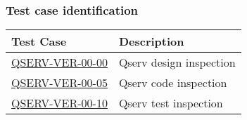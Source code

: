 \subsubsection{Test case identification}

\begin{longtable} {|p{}|p{}|}\hline
\textbf{Test Case}  & \textbf{Description} \\\hline
\hyperref[qserv-ver-00-00]{\textsc{QSERV-VER-00-00}} & Qserv design inspection \\\hline
\hyperref[qserv-ver-00-05]{\textsc{QSERV-VER-00-05}} & Qserv code inspection \\\hline
\hyperref[qserv-ver-00-10]{\textsc{QSERV-VER-00-10}} & Qserv test inspection \\\hline
\end{longtable}

